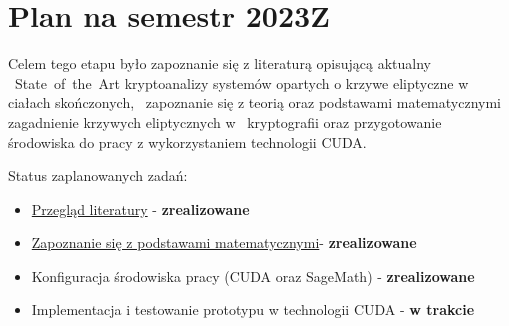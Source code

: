 \newpage %
\section{Plan na semestr 2023Z}
Celem tego etapu było zapoznanie się z literaturą opisującą aktualny \
State~of~the~Art kryptoanalizy systemów opartych o krzywe eliptyczne w ciałach skończonych, \
zapoznanie się z teorią oraz podstawami matematycznymi zagadnienie krzywych eliptycznych w \
kryptografii oraz przygotowanie środowiska do pracy z wykorzystaniem technologii CUDA. \
\newline

\indent
Status zaplanowanych zadań:
\begin{itemize}
    \item \hyperref[sc:state]{Przegląd literatury} - \textbf{zrealizowane}
    \item \hyperref[sc:wstep]{Zapoznanie się z podstawami matematycznymi}-
    \textbf{zrealizowane}
    \item Konfiguracja środowiska pracy (CUDA oraz SageMath) - \textbf{zrealizowane}
    \item Implementacja i testowanie prototypu w technologii CUDA - \textbf{w trakcie}
\end{itemize}
